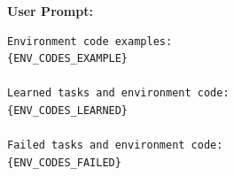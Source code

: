 \textbf{User Prompt:}
\begin{lstlisting}[language={}]
Environment code examples:
{ENV_CODES_EXAMPLE}

Learned tasks and environment code:
{ENV_CODES_LEARNED}

Failed tasks and environment code:
{ENV_CODES_FAILED}
\end{lstlisting}
